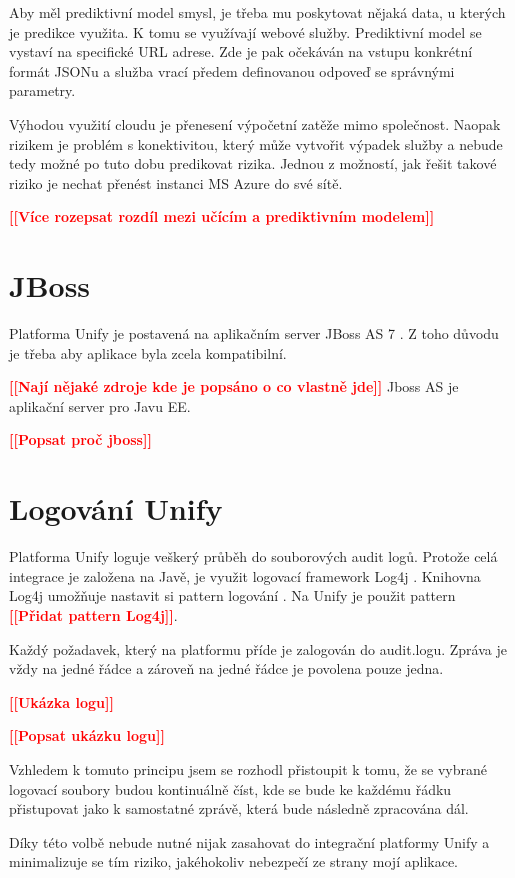 \documentclass[thesis=M,czech]{FITthesis}[2012/10/20]
\newcommand{\todo}[1]{\textcolor{red}{\textbf{[[#1]]}}}
\newcommand{\blind}[1][1]{\textcolor{gray}{\Blindtext[#1][1]}}
\begin{document}
		Aby měl prediktivní model smysl, je třeba mu poskytovat nějaká data, u kterých je predikce využita. K tomu se využívají webové služby.
		Prediktivní model se vystaví na specifické URL adrese. Zde je pak očekáván na vstupu konkrétní formát JSONu a služba vrací předem definovanou odpoveď se správnými parametry.
		
		Výhodou využití cloudu je přenesení výpočetní zatěže mimo společnost. Naopak rizikem je problém s konektivitou, který může vytvořit výpadek služby a nebude tedy možné po tuto dobu predikovat rizika. Jednou z možností, jak řešit takové riziko je nechat přenést instanci MS Azure do své sítě.
		
		\todo{Více rozepsat rozdíl mezi učícím a prediktivním modelem}
		
	\section{JBoss}
		\label{sec:jboss}
		Platforma Unify je postavená na aplikačním server JBoss AS 7 \cite{unify}. Z toho důvodu je třeba aby aplikace byla zcela kompatibilní.
		 
		 \todo{Nají nějaké zdroje kde je popsáno o co vlastně jde}
		Jboss AS je aplikační server pro Javu EE\cite{jboss}. 
			
		\todo{Popsat proč jboss}
		\blind[1]	
					
	\section{Logování Unify}
		\label{sec:logging_unify}
		Platforma Unify loguje veškerý průběh do souborových audit logů. Protože celá integrace je založena na Javě, je využit logovací framework Log4j \cite{log4j}. Knihovna Log4j umožňuje nastavit si pattern logování \cite{log4jPatternLayout}. Na Unify je použit pattern \todo{Přidat pattern Log4j}. 
		
		Každý požadavek, který na platformu příde je zalogován do audit.logu. Zpráva je vždy na jedné řádce a zároveň na jedné řádce je povolena pouze jedna.
		
		
		\todo{Ukázka logu}
		
		\todo{Popsat ukázku logu}
		
		Vzhledem k tomuto principu jsem se rozhodl přistoupit k tomu, že se vybrané logovací soubory budou kontinuálně číst, kde se bude ke každému řádku přistupovat jako k samostatné zprávě, která bude následně zpracována dál.
		
		Díky této volbě nebude nutné nijak zasahovat do integrační platformy Unify a minimalizuje se tím riziko, jakéhokoliv nebezpečí ze strany mojí aplikace.
		
\end{document}
